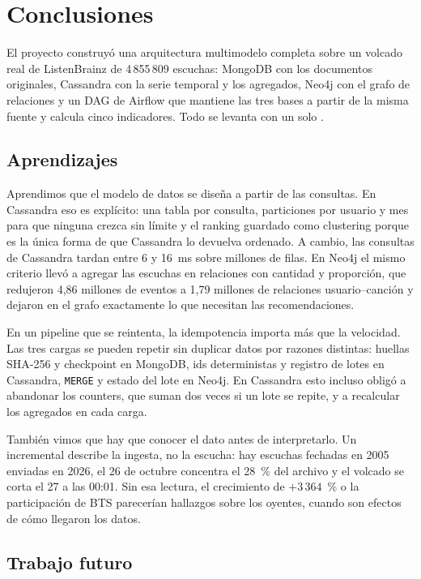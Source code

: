 \section{Conclusiones}
\label{cap:conclusiones}

El proyecto construyó una arquitectura multimodelo completa sobre un volcado real de ListenBrainz de 4\,855\,809 escuchas: MongoDB con los documentos originales, Cassandra con la serie temporal y los agregados, Neo4j con el grafo de relaciones y un DAG de Airflow que mantiene las tres bases a partir de la misma fuente y calcula cinco indicadores. Todo se levanta con un solo .

\subsection{Aprendizajes}

Aprendimos que el modelo de datos se diseña a partir de las consultas. En Cassandra eso es explícito: una tabla por consulta, particiones por usuario y mes para que ninguna crezca sin límite y el ranking guardado como clustering porque es la única forma de que Cassandra lo devuelva ordenado. A cambio, las consultas de Cassandra tardan entre 6 y 16~ms sobre millones de filas. En Neo4j el mismo criterio llevó a agregar las escuchas en relaciones con cantidad y proporción, que redujeron 4,86 millones de eventos a 1,79 millones de relaciones usuario--canción y dejaron en el grafo exactamente lo que necesitan las recomendaciones.

En un pipeline que se reintenta, la idempotencia importa más que la velocidad. Las tres cargas se pueden repetir sin duplicar datos por razones distintas: huellas SHA-256 y checkpoint en MongoDB, ids deterministas y registro de lotes en Cassandra, \texttt{MERGE} y estado del lote en Neo4j. En Cassandra esto incluso obligó a abandonar los counters, que suman dos veces si un lote se repite, y a recalcular los agregados en cada carga.

También vimos que hay que conocer el dato antes de interpretarlo. Un incremental describe la ingesta, no la escucha: hay escuchas fechadas en 2005 enviadas en 2026, el 26 de octubre concentra el 28~\% del archivo y el volcado se corta el 27 a las 00:01. Sin esa lectura, el crecimiento de $+3\,364$~\% o la participación de BTS parecerían hallazgos sobre los oyentes, cuando son efectos de cómo llegaron los datos.

\subsection{Trabajo futuro}


